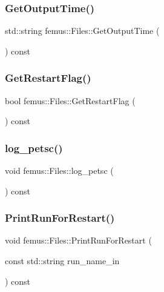 \subsubsection{\texorpdfstring{Get\+Output\+Time()}{GetOutputTime()}}
{\footnotesize\ttfamily std\+::string femus\+::\+Files\+::\+Get\+Output\+Time (\begin{DoxyParamCaption}{ }\end{DoxyParamCaption}) const\hspace{0.3cm}{\ttfamily [inline]}}

\mbox{\label{classfemus_1_1_files_a1f3ce268d1166a56a3e3829324a6a2a5}} 
\subsubsection{\texorpdfstring{Get\+Restart\+Flag()}{GetRestartFlag()}}
{\footnotesize\ttfamily bool femus\+::\+Files\+::\+Get\+Restart\+Flag (\begin{DoxyParamCaption}{ }\end{DoxyParamCaption}) const\hspace{0.3cm}{\ttfamily [inline]}}

\mbox{\label{classfemus_1_1_files_ab040fcbe943823f2f0febc9bc0f127a3}} 
\subsubsection{\texorpdfstring{log\+\_\+petsc()}{log\_petsc()}}
{\footnotesize\ttfamily void femus\+::\+Files\+::log\+\_\+petsc (\begin{DoxyParamCaption}{ }\end{DoxyParamCaption}) const}

\mbox{\label{classfemus_1_1_files_a0b6d9e8921f6e9e8cde6677eb035268d}} 
\subsubsection{\texorpdfstring{Print\+Run\+For\+Restart()}{PrintRunForRestart()}}
{\footnotesize\ttfamily void femus\+::\+Files\+::\+Print\+Run\+For\+Restart (\begin{DoxyParamCaption}\item[{const std\+::string}]{run\+\_\+name\+\_\+in }\end{DoxyParamCaption}) const}

